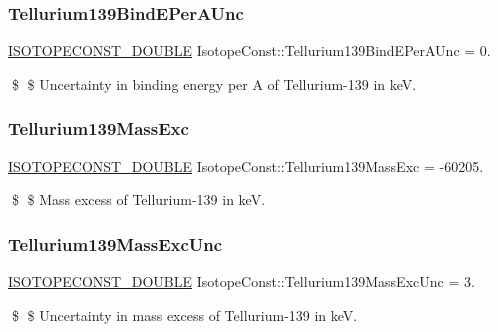 \subsubsection{\texorpdfstring{Tellurium139\+Bind\+E\+Per\+A\+Unc}{Tellurium139BindEPerAUnc}}
{\footnotesize\ttfamily \mbox{\hyperlink{group___isotope_const-_macros_ga8f45a7272ce02c0b4c65c44636ed719a}{I\+S\+O\+T\+O\+P\+E\+C\+O\+N\+S\+T\+\_\+\+D\+O\+U\+B\+LE}} Isotope\+Const\+::\+Tellurium139\+Bind\+E\+Per\+A\+Unc = 0.}

\$ \$ Uncertainty in binding energy per A of Tellurium-\/139 in keV. \mbox{\label{group___isotope_const-_tellurium-_te139_ga5cbce8ebedb6255108633792cde1a8ce}} 
\subsubsection{\texorpdfstring{Tellurium139\+Mass\+Exc}{Tellurium139MassExc}}
{\footnotesize\ttfamily \mbox{\hyperlink{group___isotope_const-_macros_ga8f45a7272ce02c0b4c65c44636ed719a}{I\+S\+O\+T\+O\+P\+E\+C\+O\+N\+S\+T\+\_\+\+D\+O\+U\+B\+LE}} Isotope\+Const\+::\+Tellurium139\+Mass\+Exc = -\/60205.}

\$ \$ Mass excess of Tellurium-\/139 in keV. \mbox{\label{group___isotope_const-_tellurium-_te139_ga22672316e227d9b2d923251e634d2ebb}} 
\subsubsection{\texorpdfstring{Tellurium139\+Mass\+Exc\+Unc}{Tellurium139MassExcUnc}}
{\footnotesize\ttfamily \mbox{\hyperlink{group___isotope_const-_macros_ga8f45a7272ce02c0b4c65c44636ed719a}{I\+S\+O\+T\+O\+P\+E\+C\+O\+N\+S\+T\+\_\+\+D\+O\+U\+B\+LE}} Isotope\+Const\+::\+Tellurium139\+Mass\+Exc\+Unc = 3.}

\$ \$ Uncertainty in mass excess of Tellurium-\/139 in keV. \mbox{\label{group___isotope_const-_tellurium-_te139_ga14889146547229cd3c5ed4d8438eeb72}} 
